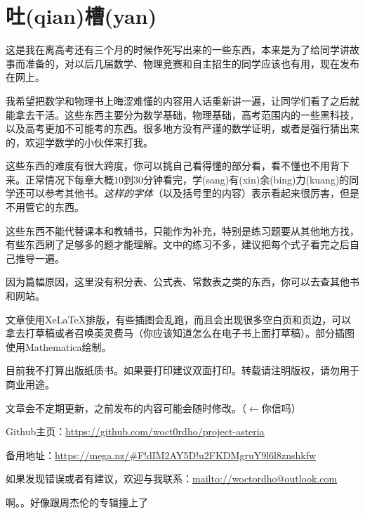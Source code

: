 \chapter{吐(qian)槽(yan)}
这是我在离高考还有三个月的时候作死写出来的一些东西，本来是为了给同学讲故事而准备的，对以后几届数学、物理竞赛和自主招生的同学应该也有用，现在发布在网上。

我希望把数学和物理书上晦涩难懂的内容用人话重新讲一遍，让同学们看了之后就能拿去干活。这些东西主要分为数学基础，物理基础，高考范围内的一些黑科技，以及高考更加不可能考的东西。很多地方没有严谨的数学证明，或者是强行猜出来的，欢迎学数学的小伙伴来打我。

这些东西的难度有很大跨度，你可以挑自己看得懂的部分看，看不懂也不用背下来。正常情况下每章大概$10$到$30$分钟看完，学(sang)有(xin)余(bing)力(kuang)的同学还可以参考其他书。\emph{这样的字体}（以及括号里的内容）表示看起来很厉害，但是不用管它的东西。

这些东西不能代替课本和教辅书，只能作为补充，特别是练习题要从其他地方找，有些东西刷了足够多的题才能理解。文中的练习不多，建议把每个式子看完之后自己推导一遍。

因为篇幅原因，这里没有积分表、公式表、常数表之类的东西，你可以去查其他书和网站。

文章使用XeLaTeX排版，有些插图会乱跑，而且会出现很多空白页和页边，可以拿去打草稿或者召唤英灵费马（你应该知道怎么在电子书上面打草稿）。部分插图使用Mathematica绘制。

目前我不打算出版纸质书。如果要打印建议双面打印。转载请注明版权，请勿用于商业用途。

文章会不定期更新，之前发布的内容可能会随时修改。（$\leftarrow$你信吗）

Github主页：\url{https://github.com/woct0rdho/project-asteria}

备用地址：\url{https://mega.nz/#F!dIM2AY5D!u2FKDMgruY9l6l8znshkfw}

如果发现错误或者有建议，欢迎与我联系：\url{mailto://woctordho@outlook.com}

啊。。好像跟周杰伦的专辑撞上了
